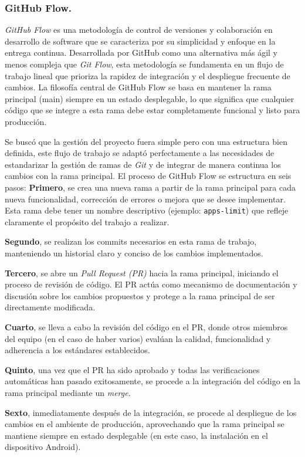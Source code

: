\subsubsection{GitHub Flow.}

\textit{GitHub Flow} es una metodología de control de versiones y colaboración en desarrollo de software que se caracteriza por su simplicidad y enfoque en la entrega continua. Desarrollada por GitHub como una alternativa más ágil y menos compleja que \textit{Git Flow}, esta metodología se fundamenta en un flujo de trabajo lineal que prioriza la rapidez de integración y el despliegue frecuente de cambios. La filosofía central de GitHub Flow se basa en mantener la rama principal (main) siempre en un estado desplegable, lo que significa que cualquier código que se integre a esta rama debe estar completamente funcional y listo para producción.

Se buscó que la gestión del proyecto fuera simple pero con una estructura bien definida, este flujo de trabajo se adaptó perfectamente a las necesidades de estandarizar la gestión de ramas de \textit{Git} y de integrar de manera continua los cambios con la rama principal. El proceso de GitHub Flow se estructura en seis pasos: \textbf{Primero}, se crea una nueva rama a partir de la rama principal para cada nueva funcionalidad, corrección de errores o mejora que se desee implementar. Esta rama debe tener un nombre descriptivo (ejemplo: \texttt{apps-limit}) que refleje claramente el propósito del trabajo a realizar.

\textbf{Segundo}, se realizan los commits necesarios en esta rama de trabajo, manteniendo un historial claro y conciso de los cambios implementados.

\textbf{Tercero}, se abre un \textit{Pull Request (PR)} hacia la rama principal, iniciando el proceso de revisión de código. El PR actúa como mecanismo de documentación y discusión sobre los cambios propuestos y protege a la rama principal de ser directamente modificada.

\textbf{Cuarto}, se lleva a cabo la revisión del código en el PR, donde otros miembros del equipo (en el caso de haber varios) evalúan la calidad, funcionalidad y adherencia a los estándares establecidos.

\textbf{Quinto}, una vez que el PR ha sido aprobado y todas las verificaciones automáticas han pasado exitosamente, se procede a la integración del código en la rama principal mediante un \textit{merge}.

\textbf{Sexto}, inmediatamente después de la integración, se procede al despliegue de los cambios en el ambiente de producción, aprovechando que la rama principal se mantiene siempre en estado desplegable (en este caso, la instalación en el dispositivo Android).

